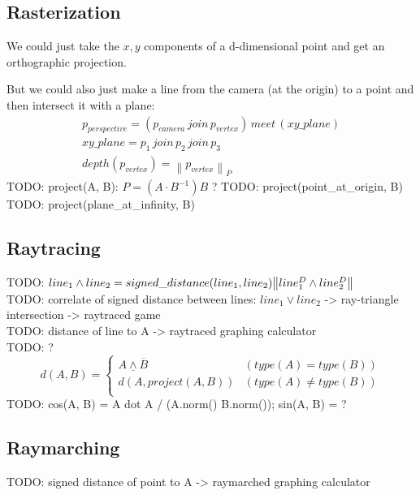 \documentclass[twoside]{article}
\newcommand{\M}[1]{\scriptstyle{#1}} %
\newcommand{\join}{{\,\M{join}\,}}
\newcommand{\meet}{{\,\M{meet}\,}}
\newcommand{\snorm}[1]{{\left\lVert{#1}\right\rVert}}
\newcommand{\pnorm}[1]{{\left\lVert{#1}\right\rVert}_P}
\begin{document}
\begin{multicols*}{2}
            \subsection{Rasterization}
            \par
                We could just take the $ x,y $ components of a d-dimensional point and get an orthographic projection.
            \par
                But we could also just make a line from the camera (at the origin) to a point and then intersect it with a plane:
                \begin{gather*}
                    p_{perspective} = (p_{camera} \join p_{vertex}) \meet (xy\_plane) \\
                    xy\_plane = p_1 \join p_2 \join p_3 \\
                    depth(p_{vertex}) = \pnorm{p_{vertex}}
                \end{gather*}
                TODO: project(A, B): $ P = (A \cdot B^{-1}) B $ ? %
                TODO: project(point\_at\_origin, B)
                TODO: project(plane\_at\_infinity, B)
            \subsection{Raytracing}
                \par
                    TODO: $ line_1 \wedge line_2 \\= signed\_distance(line_1, line_2) \snorm{line_1^D \wedge line_2^D} $ \\ %
                    TODO: correlate of signed distance between lines: $ line_1 \vee line_2 $ -> ray-triangle intersection -> raytraced game \\
                    TODO: distance of line to A -> raytraced graphing calculator \\
                    TODO: ?
                    {\small$$ d(A, B) = \begin{cases}
                        \underline{A \wedge \overline{B}} & (type(A) = type(B)) \\
                        d(A, project(A, B)) & (type(A) \ne type(B)) \\
                    \end{cases} $$}
                    TODO: cos(A, B) = A dot A / (A.norm() B.norm()); sin(A, B) = ?
            \subsection{Raymarching}
                    TODO: signed distance of point to A -> raymarched graphing calculator \\

\end{multicols*}
\end{document}
